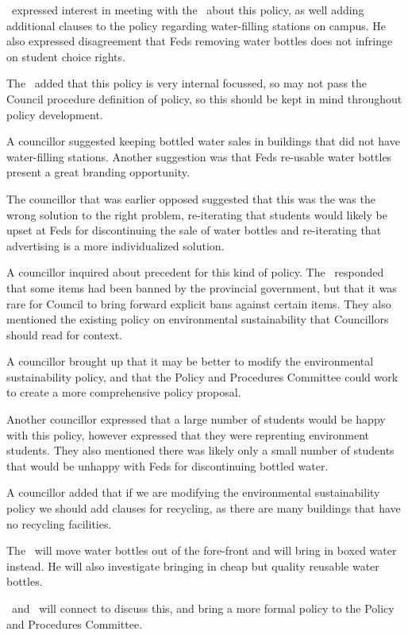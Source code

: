 \begin{information}
    \jason\ expressed interest in meeting with the \vpof\ about this policy, 
    as well adding additional clauses to the policy regarding water-filling
    stations on campus. He also expressed disagreement that Feds removing water
    bottles does not infringe on student choice rights.

    The \pres\ added that this policy is very internal focussed, so may not 
    pass the Council procedure definition of policy, so this should be kept in 
    mind throughout policy development. 

    A councillor suggested keeping bottled water sales in buildings that did
    not have water-filling stations. Another suggestion was that Feds re-usable
    water bottles present a great branding opportunity. 

    The councillor that was earlier opposed suggested that this was the was
    the wrong solution to the right problem, re-iterating that students
    would likely be upset at Feds for discontinuing the sale of water 
    bottles and re-iterating that advertising is a more individualized 
    solution. 

    A councillor inquired about precedent for this kind of policy. The \vpof\ 
    responded that some items had been banned by the provincial government, but
    that it was rare for Council to bring forward explicit bans against 
    certain items. They also mentioned the existing policy on environmental
    sustainability that Councillors should read for context.

    A councillor brought up that it may be better to modify the environmental
    sustainability policy, and that the Policy and Procedures Committee could 
    work to create a more comprehensive policy proposal. 

    Another councillor expressed that a large number of students would be happy
    with this policy, however expressed that they were reprenting environment
    students. They also mentioned there was likely only a small number of
    students that would be unhappy with Feds for discontinuing bottled water. 

    A councillor added that if we are modifying the environmental 
    sustainability policy we should add clauses for recycling, as there are 
    many buildings that have no recycling facilities. 

    The \vpof\ will move water bottles out of the fore-front and will bring in
    boxed water instead. He will also investigate bringing in cheap but quality
    reusable water bottles. 

    \jason\ and \brian\ will connect to discuss this, and bring a more formal
    policy to the Policy and Procedures Committee.

\end{information}

